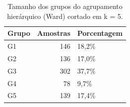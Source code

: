 \begin{table}[htbp]
\caption{Tamanho dos grupos do agrupamento hierárquico (Ward) cortado em k = 5.}
\label{tab:hierarquico}
\begin{tabular}{lrl}
\toprule
Grupo & Amostras & Porcentagem \\
\midrule
G1 & 146 & 18,2\% \\
G2 & 136 & 17,0\% \\
G3 & 302 & 37,7\% \\
G4 & 78 & 9,7\% \\
G5 & 139 & 17,4\% \\
\bottomrule
\end{tabular}
\end{table}
